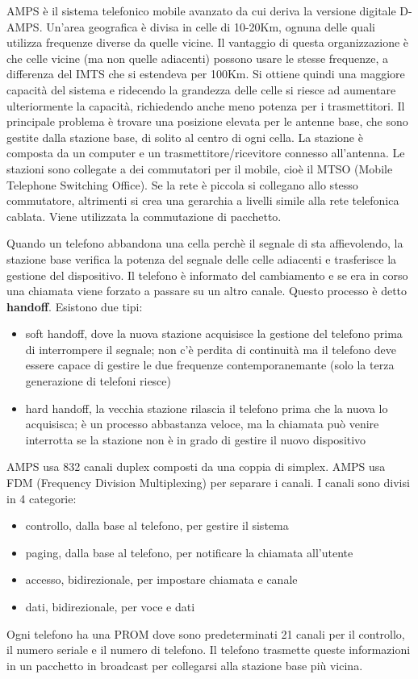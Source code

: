 AMPS è il sistema telefonico mobile avanzato da cui deriva la versione digitale D-AMPS.
Un'area geografica è divisa in celle di 10-20Km, ognuna delle quali utilizza frequenze diverse da quelle vicine.
Il vantaggio di questa organizzazione è che celle vicine (ma non quelle adiacenti) possono usare le stesse frequenze, a differenza del IMTS che si estendeva per 100Km.
Si ottiene quindi una maggiore capacità del sistema e ridecendo la grandezza delle celle si riesce ad aumentare ulteriormente la capacità, richiedendo anche meno potenza per i trasmettitori.
Il principale problema è trovare una posizione elevata per le antenne base, che sono gestite dalla stazione base, di solito al centro di ogni cella.
La stazione è composta da un computer e un trasmettitore/ricevitore connesso all'antenna.
Le stazioni sono collegate a dei commutatori per il mobile, cioè il MTSO (Mobile Telephone Switching Office).
Se la rete è piccola si collegano allo stesso commutatore, altrimenti si crea una gerarchia a livelli simile alla rete telefonica cablata.
Viene utilizzata la commutazione di pacchetto.

Quando un telefono abbandona una cella perchè il segnale di sta affievolendo, la stazione base verifica la potenza del segnale delle celle adiacenti e trasferisce la gestione del dispositivo.
Il telefono è informato del cambiamento e se era in corso una chiamata viene forzato a passare su un altro canale. 
Questo processo è detto \textbf{handoff}. Esistono due tipi:
\begin{itemize}
    \item soft handoff, dove la nuova stazione acquisisce la gestione del telefono prima di interrompere il segnale; non c'è perdita di continuità ma il telefono deve essere capace di gestire le due frequenze contemporanemante (solo la terza generazione di telefoni riesce)
    \item hard handoff, la vecchia stazione rilascia il telefono prima che la nuova lo acquisisca; è un processo abbastanza veloce, ma la chiamata può venire interrotta se la stazione non è in grado di gestire il nuovo dispositivo
\end{itemize}
AMPS usa 832 canali duplex composti da una coppia di simplex. 
AMPS usa FDM (Frequency Division Multiplexing) per separare i canali.
I canali sono divisi in 4 categorie:
\begin{itemize}
    \item controllo, dalla base al telefono, per gestire il sistema
    \item paging, dalla base al telefono, per notificare la chiamata all'utente
    \item accesso, bidirezionale, per impostare chiamata e canale
    \item dati, bidirezionale, per voce e dati
\end{itemize}
Ogni telefono ha una PROM dove sono predeterminati 21 canali per il controllo, il numero seriale e il numero di telefono. 
Il telefono trasmette queste informazioni in un pacchetto in broadcast per collegarsi alla stazione base più vicina.

